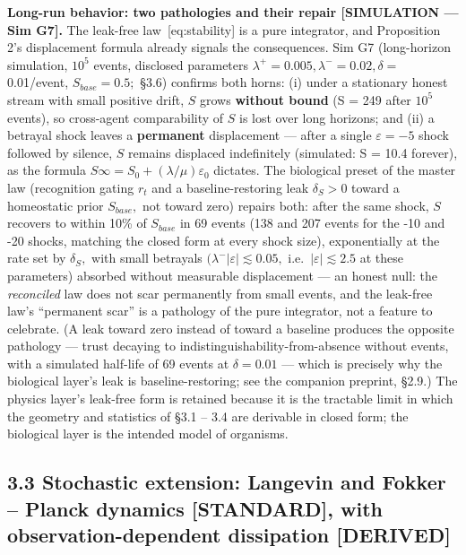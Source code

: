 \documentclass[
]{article}
\begin{document}
\textbf{Long-run behavior: two pathologies and their repair
{[}SIMULATION --- Sim G7{]}.} The leak-free law~{[}eq:stability{]} is a
pure integrator, and Proposition 2's displacement formula already
signals the consequences. Sim G7 (long-horizon simulation, \(10^{5}\)
events, disclosed parameters
\(\lambda^{+} = 0.005, \lambda^{-} = 0.02, \delta =\) 0.01/event,
\(S_{base} = 0.5;\) §3.6) confirms both horns: (i) under a stationary
honest stream with small positive drift, \(S\) grows \textbf{without
bound} (S = 249 after \(10^{5}\) events), so cross-agent comparability
of \(S\) is lost over long horizons; and (ii) a betrayal shock leaves a
\textbf{permanent} displacement --- after a single \(\varepsilon = -5\)
shock followed by silence, \(S\) remains displaced indefinitely
(simulated: S = 10.4 forever), as the formula
\(S\infty = S_{0} + (\lambda/\mu)\varepsilon_{0}\) dictates. The
biological preset of the master law (recognition gating \(r_t\) and a
baseline-restoring leak \(\delta_S > 0\) toward a homeostatic prior
\(S_{base},\) not toward zero) repairs both: after the same shock, \(S\)
recovers to within 10\% of \(S_{base}\) in 69 events (138 and 207 events
for the -10 and -20 shocks, matching the closed form at every shock
size), exponentially at the rate set by \(\delta_S,\) with small
betrayals \((\lambda^{-}|\varepsilon| \lesssim 0.05,\)
i.e.~\(|\varepsilon| \lesssim 2.5\) at these parameters) absorbed
without measurable displacement --- an honest null: the
\emph{reconciled} law does not scar permanently from small events, and
the leak-free law's ``permanent scar'' is a pathology of the pure
integrator, not a feature to celebrate. (A leak toward zero instead of
toward a baseline produces the opposite pathology --- trust decaying to
indistinguishability-from-absence without events, with a simulated
half-life of 69 events at \(\delta = 0.01\) --- which is precisely why
the biological layer's leak is baseline-restoring; see the companion
preprint, §2.9.) The physics layer's leak-free form is retained because
it is the tractable limit in which the geometry and statistics of §3.1
-- 3.4 are derivable in closed form; the biological layer is the
intended model of organisms.

\subsection{3.3 Stochastic extension: Langevin and Fokker -- Planck
dynamics {[}STANDARD{]}, with observation-dependent dissipation
{[}DERIVED{]}}\label{stochastic-extension-langevin-and-fokker-planck-dynamics-standard-with-observation-dependent-dissipation-derived}
\end{document}
